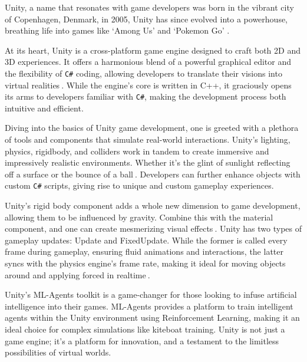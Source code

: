 Unity, a name that resonates with game developers was born in the vibrant city of Copenhagen, Denmark, in 2005, Unity has since evolved into a powerhouse, breathing life into games like `Among Us' and `Pokemon Go' \cite{unity100seconds}.

At its heart, Unity is a cross-platform game engine designed to craft both 2D and 3D experiences. It offers a harmonious blend of a powerful graphical editor and the flexibility of \texttt{C\#} coding, allowing developers to translate their visions into virtual realities$~$\cite{unitymanual2021}. While the engine's core is written in C++, it graciously opens its arms to developers familiar with \texttt{C\#}, making the development process both intuitive and efficient.

Diving into the basics of Unity game development, one is greeted with a plethora of tools and components that simulate real-world interactions. Unity's lighting, physics, rigidbody, and colliders work in tandem to create immersive and impressively realistic environments. Whether it's the glint of sunlight reflecting off a surface or the bounce of a ball$~$\cite{goldstone2010}. Developers can further enhance objects with custom \texttt{C\#} scripts, giving rise to unique and custom gameplay experiences.


Unity's rigid body component adds a whole new dimension to game development, allowing them to be influenced by gravity. Combine this with the material component, and one can create mesmerizing visual effects$~$\cite{blackman2012}. Unity has two types of gameplay updates: Update and FixedUpdate. While the former is called every frame during gameplay, ensuring fluid animations and interactions, the latter syncs with the physics engine's frame rate, making it ideal for moving objects around and applying forced in realtime$~$\cite{unityupdatefixedupdate}.

Unity's ML-Agents toolkit is a game-changer for those looking to infuse artificial intelligence into their games. ML-Agents provides a platform to train intelligent agents within the Unity environment using Reinforcement Learning, making it an ideal choice for complex simulations like kiteboat training. Unity is not just a game engine; it's a platform for innovation, and a testament to the limitless possibilities of virtual worlds.

